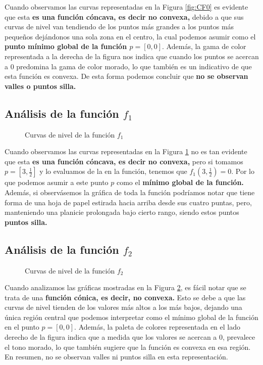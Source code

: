Cuando observamos las curvas representadas en la Figura \ref{fig:CF0} es evidente que esta \textbf{es una función cóncava, es decir no convexa,} debido a que sus curvas de nivel van tendiendo de los puntos más grandes a los puntos más pequeños dejándonos una sola zona en el centro, la cual podemos asumir como el \textbf{punto mínimo global de la función $p=\left[0,0\right]$}. Además, la gama de color representada a la derecha de la figura nos indica que cuando los puntos se acercan a 0 predomina la gama de color morado, lo que también es un indicativo de que esta función es convexa. De esta forma podemos concluir que \textbf{no se observan valles o puntos silla.}


\newpage

\subsection{Análisis de la función $f_1$}

\begin{figure}[h!]
  \centering
    
  \caption{Curvas de nivel de la función $f_1$}
  \captionsetup{justification=centering}
  \label{fig:CF1}
\end{figure}

Cuando observamos las curvas representadas en la Figura \ref{fig:CF1} no es tan evidente que esta \textbf{es una función cóncava, es decir no convexa,} pero si tomamos $p=\left[3, \frac{1}{2}\right]$ y lo evaluamos de la en la función, tenemos que $f_1(3, \frac{1}{2}) = 0$. Por lo que podemos asumir a este punto $p$ como el \textbf{mínimo global de la función.} Además, si observásemos la gráfica de toda la función podríamos notar que tiene forma de una hoja de papel estirada hacia arriba desde sus cuatro puntas, pero, manteniendo una planicie prolongada bajo cierto rango, siendo estos puntos \textbf{puntos silla.}

\newpage
\subsection{Análisis de la función $ f_2$}
\begin{figure}[h!]
  \centering
    
  \caption{Curvas de nivel de la función $f_2$}
  \captionsetup{justification=centering}
  \label{fig:CF2}
\end{figure}


Cuando analizamos las gráficas mostradas en la Figura \ref{fig:CF2}, es fácil notar que se trata de una \textbf{función cónica, es decir, no convexa.} Esto se debe a que las curvas de nivel tienden de los valores más altos a los más bajos, dejando una única región central que podemos interpretar como el mínimo global de la función en el punto $p=\left[0,0\right]$. Además, la paleta de colores representada en el lado derecho de la figura indica que a medida que los valores se acercan a 0, prevalece el tono morado, lo que también sugiere que la función es convexa en esa región. En resumen, no se observan valles ni puntos silla en esta representación.

